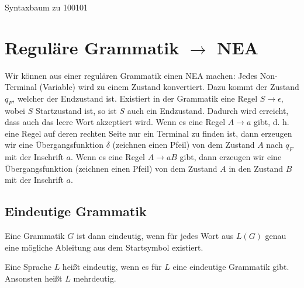 \documentclass{lehramt-informatik-haupt}
\begin{document}
Syntaxbaum zu 100101
\begin{center}
\end{center}

%

\section{Reguläre Grammatik $\rightarrow$ NEA}

Wir können aus einer regulären Grammatik einen NEA machen: Jedes
Non-Terminal (Variable) wird zu einem Zustand konvertiert. Dazu kommt
der Zustand $q_{F}$, welcher der Endzustand ist. Existiert in der
Grammatik eine Regel $S \rightarrow \epsilon$, wobei $S$ Startzustand
ist, so ist $S$ auch ein Endzustand. Dadurch wird erreicht, dass auch
das leere Wort akzeptiert wird. Wenn es eine Regel $A \rightarrow a$
gibt, d. h. eine Regel auf deren rechten Seite nur ein Terminal zu
finden ist, dann erzeugen wir eine Übergangsfunktion $\delta$ (zeichnen
einen Pfeil) von dem Zustand $A$ nach $q_{F}$ mit der Inschrift $a$.
Wenn es eine Regel $A\rightarrow aB$ gibt, dann erzeugen wir eine
Übergangsfunktion (zeichnen einen Pfeil) von dem Zustand $A$ in den
Zustand $B$ mit der Inschrift $a$.

\subsection{Eindeutige Grammatik}

Eine Grammatik $G$ ist dann eindeutig, wenn für jedes Wort aus $L(G)$
genau eine mögliche Ableitung aus dem Startsymbol existiert.

Eine Sprache $L$ heißt eindeutig, wenn es für $L$ eine eindeutige
Grammatik gibt. Ansonsten heißt $L$ mehrdeutig.

%
\end{document}
